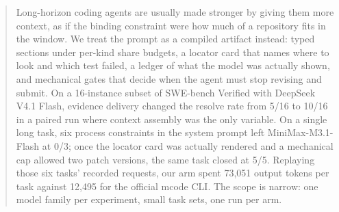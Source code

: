 \begin{abstract}
Long-horizon coding agents are usually made stronger by giving them more context, as if the binding constraint were how much of a repository fits in the window.
We treat the prompt as a compiled artifact instead: typed sections under per-kind share budgets, a locator card that names where to look and which test failed, a ledger of what the model was actually shown, and mechanical gates that decide when the agent must stop revising and submit.
On a 16-instance subset of SWE-bench Verified with DeepSeek V4.1 Flash, evidence delivery changed the resolve rate from 5/16 to 10/16 in a paired run where context assembly was the only variable.
On a single long task, six process constraints in the system prompt left MiniMax-M3.1-Flash at 0/3; once the locator card was actually rendered and a mechanical cap allowed two patch versions, the same task closed at 5/5.
Replaying those six tasks' recorded requests, our arm spent 73,051 output tokens per task against 12,495 for the official mcode CLI.
The scope is narrow: one model family per experiment, small task sets, one run per arm.
\end{abstract}

